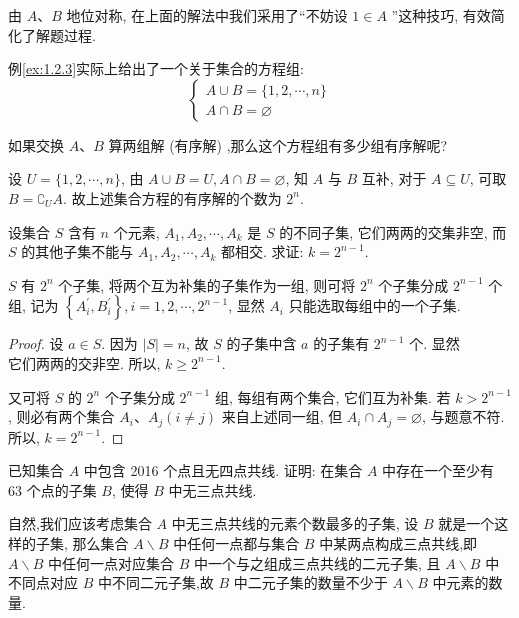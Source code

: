 \begin{note}
	由 $A 、 B$ 地位对称, 在上面的解法中我们采用了“不妨设 $1 \in A$ ”这种技巧, 有效简化了解题过程.
\end{note}

例\ref{ex:1.2.3}实际上给出了一个关于集合的方程组:
$$
	\left\{\begin{array}{l}
		A \cup B=\{1,2, \cdots, n\} \\
		A \cap B=\varnothing
	\end{array}\right.
$$

如果交换 $A 、 B$ 算两组解 (有序解) ,那么这个方程组有多少组有序解呢?

设 $U=\{1,2, \cdots, n\}$, 由 $A \cup B=U, A \cap B=\varnothing$, 知 $A$ 与 $B$ 互补, 对于 $A \subseteq U$, 可取 $B=\complement_{U} A$. 故上述集合方程的有序解的个数为 $2^{n}$.

\begin{example}
	设集合 $S$ 含有 $n$ 个元素, $A_{1}, A_{2}, \cdots, A_{k}$ 是 $S$ 的不同子集, 它们两两的交集非空, 而 $S$ 的其他子集不能与 $A_{1}, A_{2}, \cdots, A_{k}$ 都相交. 求证: $k=2^{n-1}$.
\end{example}

\begin{analysis}
	$S$ 有 $2^{n}$ 个子集, 将两个互为补集的子集作为一组, 则可将 $2^{n}$ 个子集分成 $2^{n-1}$ 个组, 记为 $\left\{A_{i}^{\prime}, B_{i}^{\prime}\right\}, i=1,2, \cdots, 2^{n-1}$, 显然 $A_{i}$ 只能选取每组中的一个子集.
\end{analysis}

\begin{proof}
	设 $a \in S$. 因为 $|S|=n$, 故 $S$ 的子集中含 $a$ 的子集有 $2^{n-1}$ 个. 显然\\
	它们两两的交非空. 所以, $k \geqslant 2^{n-1}$.

	又可将 $S$ 的 $2^{n}$ 个子集分成 $2^{n-1}$ 组, 每组有两个集合, 它们互为补集. 若 $k>2^{n-1}$, 则必有两个集合 $A_{i} 、 A_{j}(i \neq j)$ 来自上述同一组, 但 $A_{i} \cap A_{j}=\varnothing$, 与题意不符. 所以, $k=2^{n-1}$.
\end{proof}

\begin{example}
	已知集合 $A$ 中包含 2016 个点且无四点共线. 证明: 在集合 $A$ 中存在一个至少有 63 个点的子集 $B$, 使得 $B$ 中无三点共线.
\end{example}

\begin{analysis}
	自然,我们应该考虑集合 $A$ 中无三点共线的元素个数最多的子集, 设 $B$ 就是一个这样的子集, 那么集合 $A \backslash B$ 中任何一点都与集合 $B$ 中某两点构成三点共线,即 $A \backslash B$ 中任何一点对应集合 $B$ 中一个与之组成三点共线的二元子集, 且 $A \backslash B$ 中不同点对应 $B$ 中不同二元子集,故 $B$ 中二元子集的数量不少于 $A \backslash B$ 中元素的数量.
\end{analysis}


